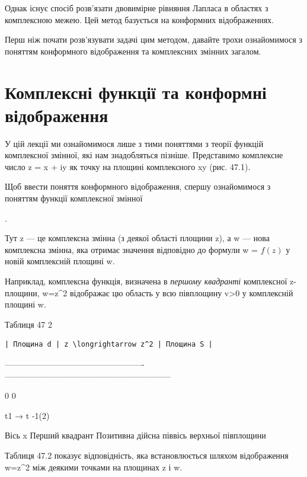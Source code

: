 \documentclass[
  ukrainian,
]{article}
\begin{document}
Однак існує спосіб розв'язати двовимірне рівняння Лапласа в областях з
комплексною межею. Цей метод базується на конформних відображеннях.

Перш ніж почати розв'язувати задачі цим методом, давайте трохи
ознайомимося з поняттям конформного відображення та комплексних змінних
загалом.

\section{Комплексні функції та конформні
відображення}\label{ux43aux43eux43cux43fux43bux435ux43aux441ux43dux456-ux444ux443ux43dux43aux446ux456ux457-ux442ux430-ux43aux43eux43dux444ux43eux440ux43cux43dux456-ux432ux456ux434ux43eux431ux440ux430ux436ux435ux43dux43dux44f}

У цій лекції ми ознайомимося лише з тими поняттями з теорії функцій
комплексної змінної, які нам знадобляться пізніше. Представимо
комплексне число z = x + iy як точку на площині комплексного xy (рис.
47.1).

Щоб ввести поняття конформного відображення, спершу ознайомимося з
поняттям функції комплексної змінної

.

Тут z --- це комплексна змінна (з деякої області площини z), а w ---
нова комплексна змінна, яка отримає значення відповідно до формули w =
\(f(z)\) у новій комплексній площині w.

Наприклад, комплексна функція, визначена в \emph{першому квадранті}
комплексної z-площини, w=z\^{}2 відображає цю область у всю півплощину
v\textgreater0 у комплексній площині w.

Таблиця 47 2

\begin{verbatim}
| Площина d | z \longrightarrow z^2 | Площина S |
\end{verbatim}

\textbar--------------------------\textbar-------------------------\textbar------------------------------------------------------------\textbar{}

0 \textbar{} \textbar{} 0 \textbar{}

t1 → t \textbar{} \textbar{} -1(2) \textbar{}

Вісь x Перший квадрант \textbar{} \textbar{} Позитивна дійсна піввісь
верхньої півплощини \textbar{}

Таблиця 47.2 показує відповідність, яка встановлюється шляхом
відображення w=z\^{}2 між деякими точками на площинах z і w.
\end{document}

